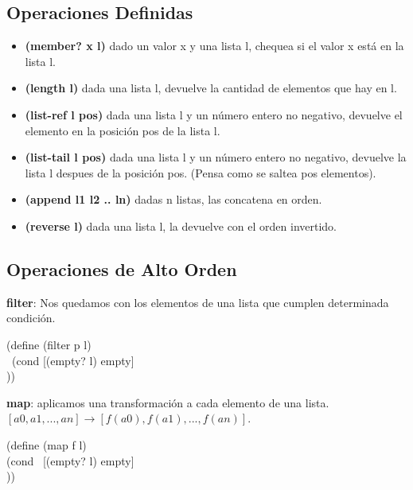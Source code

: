 \documentclass[11pt,a4paper]{article}
\begin{document}
\subsection{Operaciones Definidas}
\begin{itemize}
\item \textbf{(member? x l)} dado un valor x y una lista l, chequea si el valor x está en la lista l.
\item \textbf{(length l)} dada una lista l, devuelve la cantidad de elementos que hay en l.
\item \textbf{(list-ref l pos)} dada una lista l y un n\'umero entero no negativo, devuelve el elemento en la posici\'on pos de la lista l.
\item \textbf{(list-tail l pos)} dada una lista l y un n\'umero entero no negativo, devuelve la lista l despues de la posici\'on pos. (Pensa como se saltea pos elementos).
\item \textbf{(append l1 l2 .. ln)} dadas n listas, las concatena en orden.
\item \textbf{(reverse l)} dada una lista l, la devuelve con el orden invertido.
\end{itemize}

\subsection{Operaciones de Alto Orden}
\textbf{filter}: Nos quedamos con los elementos de una lista que cumplen determinada condici\'on.
\begin{siderules}
(define (filter p l)\\
\indent \indent \indent \ (cond [(empty? l) empty]\\
\indent \indent \indent \indent {}))
\end{siderules}

\noindent \textbf{map}: aplicamos una transformaci\'on a cada elemento de una lista. $[a0, a1, ..., an] \rightarrow [f(a0), f(a1), ..., f(an)]$.
\begin{siderules}
(define (map f l)\\
\indent \indent \indent (cond \ [(empty? l) empty]\\
\indent \indent \indent \indent {}))
\end{siderules}
\end{document}
